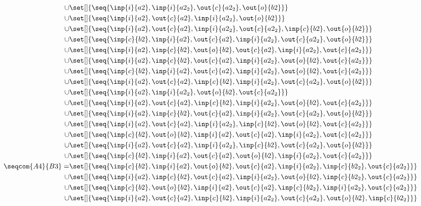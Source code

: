 \begin{align*}
\cup&\set[]{\seq{\inp{i}{a2},\inp{i}{a2_2},\out{c}{a2_2},\out{o}{b2}}}\\
\cup&\set[]{\seq{\inp{i}{a2},\out{c}{a2},\inp{i}{a2_2},\out{o}{b2}}}\\
\cup&\set[]{\seq{\inp{i}{a2},\out{c}{a2},\inp{i}{a2_2},\out{c}{a2_2},\inp{c}{b2},\out{o}{b2}}}\\
\cup&\set[]{\seq{\inp{c}{b2},\inp{i}{a2},\out{c}{a2},\inp{i}{a2_2},\out{c}{a2_2},\out{o}{b2}}}\\
\cup&\set[]{\seq{\inp{i}{a2},\inp{c}{b2},\out{o}{b2},\out{c}{a2},\inp{i}{a2_2},\out{c}{a2_2}}}\\
\cup&\set[]{\seq{\inp{i}{a2},\inp{c}{b2},\out{c}{a2},\inp{i}{a2_2},\out{o}{b2},\out{c}{a2_2}}}\\
\cup&\set[]{\seq{\inp{c}{b2},\inp{i}{a2},\out{c}{a2},\inp{i}{a2_2},\out{o}{b2},\out{c}{a2_2}}}\\
\cup&\set[]{\seq{\inp{i}{a2},\out{c}{a2},\inp{c}{b2},\inp{i}{a2_2},\out{c}{a2_2},\out{o}{b2}}}\\
\cup&\set[]{\seq{\inp{i}{a2},\inp{i}{a2_2},\out{o}{b2},\out{c}{a2_2}}}\\
\cup&\set[]{\seq{\inp{i}{a2},\out{c}{a2},\inp{c}{b2},\inp{i}{a2_2},\out{o}{b2},\out{c}{a2_2}}}\\
\cup&\set[]{\seq{\inp{i}{a2},\inp{c}{b2},\out{c}{a2},\inp{i}{a2_2},\out{c}{a2_2},\out{o}{b2}}}\\
\cup&\set[]{\seq{\inp{i}{a2},\out{c}{a2},\inp{i}{a2_2},\inp{c}{b2},\out{o}{b2},\out{c}{a2_2}}}\\
\cup&\set[]{\seq{\inp{c}{b2},\out{o}{b2},\inp{i}{a2},\out{c}{a2},\inp{i}{a2_2},\out{c}{a2_2}}}\\
\cup&\set[]{\seq{\inp{i}{a2},\out{c}{a2},\inp{i}{a2_2},\inp{c}{b2},\out{c}{a2_2},\out{o}{b2}}}\\
\cup&\set[]{\seq{\inp{c}{b2},\inp{i}{a2},\out{c}{a2},\out{o}{b2},\inp{i}{a2_2},\out{c}{a2_2}}}\\
%
\seqcom{A4}{B3} = &\set[]{\seq{\inp{c}{b2},\inp{i}{a2},\out{o}{b2},\out{c}{a2},\inp{i}{a2_2},\inp{c}{b2_2},\out{c}{a2_2}}}\\
\cup&\set[]{\seq{\inp{i}{a2},\inp{c}{b2},\out{c}{a2},\inp{i}{a2_2},\out{o}{b2},\inp{c}{b2_2},\out{c}{a2_2}}}\\
\cup&\set[]{\seq{\inp{c}{b2},\out{o}{b2},\inp{i}{a2},\out{c}{a2},\inp{c}{b2_2},\inp{i}{a2_2},\out{c}{a2_2}}}\\
\cup&\set[]{\seq{\inp{i}{a2},\out{c}{a2},\inp{c}{b2},\inp{i}{a2_2},\out{c}{a2_2},\out{o}{b2},\inp{c}{b2_2}}}\\

\end{align*}
